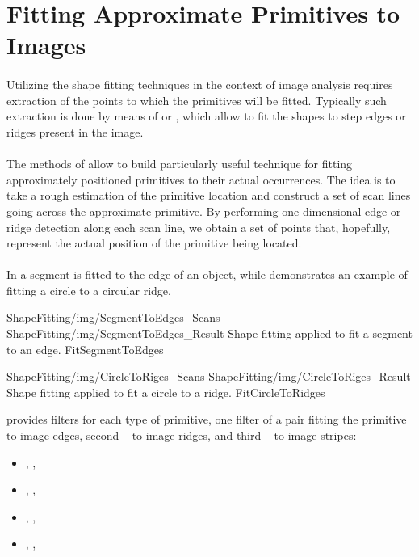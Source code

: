 \section{Fitting Approximate Primitives to Images}

\paragraph*{}
Utilizing the shape fitting techniques in the context of image analysis requires extraction of the points to which the primitives will be fitted. Typically such extraction is done by means of  or , which allow to fit the shapes to step edges or ridges present in the image.

\paragraph*{}
The methods of  allow to build particularly useful technique for fitting approximately positioned primitives to their actual occurrences. The idea is to take a rough estimation of the primitive location and construct a set of scan lines going across the approximate primitive. By performing one-dimensional edge or ridge detection along each scan line, we obtain a set of points that, hopefully, represent the actual position of the primitive being located.

\paragraph*{}
In  a segment is fitted to the edge of an object, while  demonstrates an example of fitting a circle to a circular ridge.

\twoFigures
{ShapeFitting/img/SegmentToEdges_Scans}
{ShapeFitting/img/SegmentToEdges_Result}
{Shape fitting applied to fit a segment to an edge.}
{FitSegmentToEdges}
{\basicWidth}

\twoFigures
{ShapeFitting/img/CircleToRiges_Scans}
{ShapeFitting/img/CircleToRiges_Result}
{Shape fitting applied to fit a circle to a ridge.}
{FitCircleToRidges}
{\basicWidth}

\begin{refImpl}
\studio provides filters for each type of primitive, one filter of a pair fitting the primitive to image edges, second -- to image ridges, and third -- to image stripes:
\begin{itemize}
	\item {}, , 
	\item {}, , 
	\item {}, , 
	\item {}, , 
\end{itemize}
\end{refImpl}